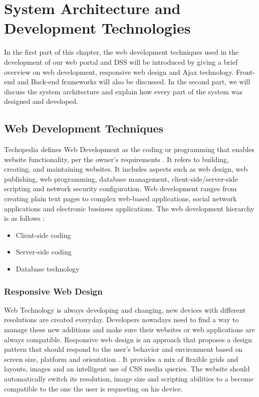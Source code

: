 \chapter{System Architecture and Development Technologies}
\label{ChapterFive}
In the first part of this chapter, the web development techniques used in the development of our web portal and DSS will be introduced by giving a brief overview on web development, responsive web design and Ajax technology. Front-end and Back-end frameworks will also be discussed. In the second part, we will discuss the system architecture and explain how every part of the system was designed and developed.
\section{Web Development Techniques}
Techopedia defines Web Development as the coding or programming that enables website functionality, per the owner's requirements \cite{WebDevelopment}. It refers to building, creating, and maintaining websites. It includes aspects such as web design, web publishing, web programming, database management, client-side/server-side scripting and network security configuration. Web development ranges from creating plain text pages to complex web-based applications, social network applications and electronic business applications. The web development hierarchy is as follows \cite{WebDevelopment}:\\
\begin{itemize}
	\item Client-side coding
	\item Server-side coding
	\item Database technology
\end{itemize}
\subsection{Responsive Web Design}
Web Technology is always developing and changing, new devices with different resolutions are created everyday. Developers nowadays need to find a way to manage these new additions and make sure their websites or web applications are always compatible. Responsive web design is an approach that proposes a design pattern that should respond to the user’s behavior and environment based on screen size, platform and orientation \cite{RWD}. It provides a mix of flexible grids and layouts, images and an intelligent use of CSS media queries. The website should automatically switch its resolution, image size and scripting abilities to a become compatible to the one the user is requesting on his device.

